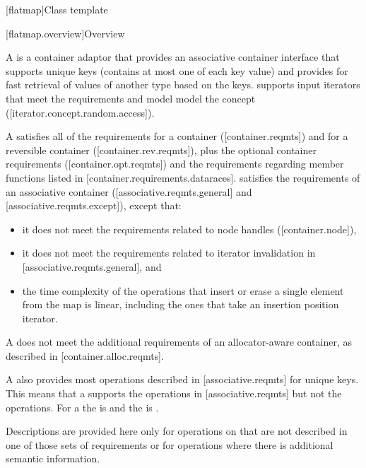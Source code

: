 \noindent\makebox[\linewidth]{\rule{\textwidth}{0.4pt}}

\setcounter{subsection}{7}
\begin{addedblock}
[flatmap]{Class template }

[flatmap.overview]{Overview}

\pnum
{}%
A  is a container adaptor that provides an associative
container interface that supports unique keys (contains at most one of each
key value) and provides for fast retrieval of values of another type 
based on the keys.  supports input iterators that meet the
 requirements and model model the 
concept ([iterator.concept.random.access]).

\pnum
A  satisfies all of the requirements for a container
([container.reqmts]) and for a reversible container ([container.rev.reqmts]),
plus the optional container requirements ([container.opt.reqmts]) and the
requirements regarding  member functions listed in
[container.requirements.dataraces].   satisfies the
requirements of an associative container ([associative.reqmts.general] and
[associative.reqmts.except]), except that:
\begin{itemize}
\item it does not meet the requirements related to node handles ([container.node]),
\item it does not meet the requirements related to iterator invalidation in [associative.reqmts.general], and
\item the time complexity of the operations that insert or erase a single
element from the map is linear, including the ones that take an insertion
position iterator.
\end{itemize}
A  does not meet the additional requirements of an
allocator-aware container, as described in [container.alloc.reqmts].

\pnum
A  also provides most operations described
in [associative.reqmts] for unique keys.  This means that a
 supports the  operations
in [associative.reqmts] but not the  operations.  For
a  the  is  and the
 is .

\pnum
Descriptions are provided here only for operations on  that
are not described in one of those sets of requirements or for operations where
there is additional semantic information.


\end{addedblock}
